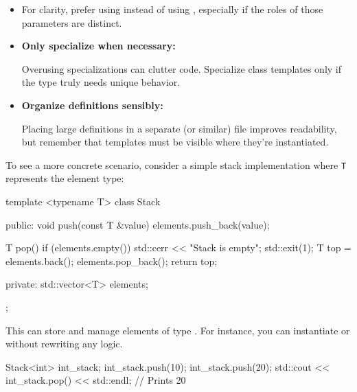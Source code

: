\begin{tipsblock}
    \begin{itemize}
        \item {}
        
        For clarity, prefer using  instead of using , especially if the roles of those parameters are distinct.

        \item \textbf{Only specialize when necessary:}
        
        Overusing specializations can clutter code. Specialize class templates only if the type truly needs unique behavior.

        \item \textbf{Organize definitions sensibly:}
        
        Placing large definitions in a separate  (or similar) file improves readability, but remember that templates must be visible where they're instantiated.

    \end{itemize}
\end{tipsblock}

\begin{exampleblock}
To see a more concrete scenario, consider a simple stack implementation where \texttt{T} represents the element type:

\begin{codeblock}[language=C++]
template <typename T>
class Stack {
public:
    void push(const T &value) {
        elements.push_back(value);
    }

    T pop() {
        if (elements.empty()) {
            std::cerr << "Stack is empty\n";
            std::exit(1);
        }
        T top = elements.back();
        elements.pop_back();
        return top;
    }

private:
    std::vector<T> elements;
};
\end{codeblock}

This  can store and manage elements of type . For instance, you can instantiate  or  without rewriting any logic.

\begin{codeblock}[language=C++]
Stack<int> int_stack;
int_stack.push(10);
int_stack.push(20);
std::cout << int_stack.pop() << std::endl; // Prints 20
\end{codeblock}
\end{exampleblock}

